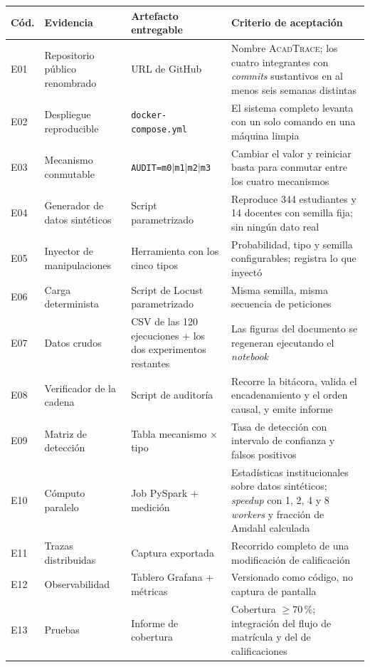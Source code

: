\documentclass[11pt,a4paper]{article}
\begin{document}
\begin{center}
	\footnotesize
	\begin{longtable}{@{}p{0.9cm}p{4.6cm}p{4.2cm}p{5.0cm}@{}}
		\toprule
		\textbf{Cód.} & \textbf{Evidencia} & \textbf{Artefacto entregable} & \textbf{Criterio de aceptación} \\
		\midrule
		\endhead
		E01 & Repositorio público renombrado & URL de GitHub & Nombre \textsc{AcadTrace}; los cuatro integrantes con \emph{commits} sustantivos en al menos seis semanas distintas \\
		E02 & Despliegue reproducible & \texttt{docker-compose.yml} & El sistema completo levanta con un solo comando en una máquina limpia \\
		E03 & Mecanismo conmutable & \texttt{AUDIT=m0$\mid$m1$\mid$m2$\mid$m3} & Cambiar el valor y reiniciar basta para conmutar entre los cuatro mecanismos \\
		E04 & Generador de datos sintéticos & Script parametrizado & Reproduce 344 estudiantes y 14 docentes con semilla fija; sin ningún dato real \\
		E05 & Inyector de manipulaciones & Herramienta con los cinco tipos & Probabilidad, tipo y semilla configurables; registra lo que inyectó \\
		E06 & Carga determinista & Script de Locust parametrizado & Misma semilla, misma secuencia de peticiones \\
		E07 & Datos crudos & CSV de las 120 ejecuciones + los dos experimentos restantes & Las figuras del documento se regeneran ejecutando el \emph{notebook} \\
		E08 & Verificador de la cadena & Script de auditoría & Recorre la bitácora, valida el encadenamiento y el orden causal, y emite informe \\
		E09 & Matriz de detección & Tabla mecanismo $\times$ tipo & Tasa de detección con intervalo de confianza y falsos positivos \\
		E10 & Cómputo paralelo & Job PySpark + medición & Estadísticas institucionales sobre datos sintéticos; \emph{speedup} con 1, 2, 4 y 8 \emph{workers} y fracción de Amdahl calculada \\
		E11 & Trazas distribuidas & Captura exportada & Recorrido completo de una modificación de calificación \\
		E12 & Observabilidad & Tablero Grafana + métricas & Versionado como código, no captura de pantalla \\
		E13 & Pruebas & Informe de cobertura & Cobertura $\geq 70\,\%$; integración del flujo de matrícula y del de calificaciones \\

\end{longtable}
\end{center}
\end{document}
